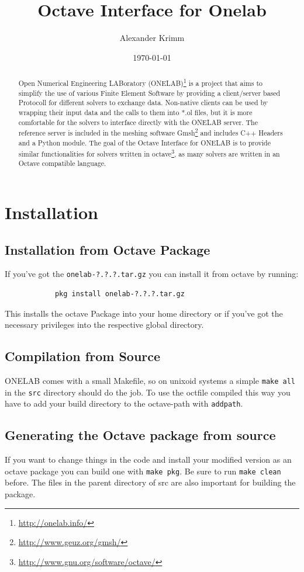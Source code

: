 \documentclass[article,english,colorback,accentcolor=tud9b,11pt]{tudreport}
\title{Octave Interface for Onelab}
\subtitle{Alexander Krimm}
\date{\today}
\begin{document}
	
    \maketitle

		\begin{abstract}
			Open Numerical Engineering LABoratory (ONELAB)\footnote{\url{http://onelab.info/}} is a project that aims to simplify the use of various Finite Element Software by providing a client/server based Protocoll for different solvers to exchange data. Non-native clients can be used by wrapping their input data and the calls to them into *.ol files, but it is more comfortable for the solvers to interface directly with the ONELAB server. The reference server is included in the meshing software Gmsh\footnote{\url{http://www.geuz.org/gmsh/}} and includes C++ Headers and a Python module. The goal of the Octave Interface for ONELAB is to provide similar functionalities for solvers written in octave\footnote{\url{http://www.gnu.org/software/octave/}}, as many solvers are written in an Octave compatible language.
		\end{abstract}

		\section{Installation}
		\subsection{Installation from Octave Package}
		If you've got the \texttt{onelab-?.?.?.tar.gz} you can install it from octave by running:
		\begin{lstlisting} 
			pkg install onelab-?.?.?.tar.gz
		\end{lstlisting}
		This installs the octave Package into your home directory or if you've got the necessary privileges into the respective global directory.

		\subsection{Compilation from Source}
		ONELAB comes with a small Makefile, so on unixoid systems a simple \texttt{make all} in the \texttt{src} directory should do the job. To use the octfile compiled this way you have to add your build directory to the octave-path with \texttt{addpath}.

		\subsection{Generating the Octave package from source}
		If you want to change things in the code and install your modified version as an octave package you can build one with \texttt{make pkg}. Be sure to run \texttt{make clean} before. The files in the parent directory of src are also important for building the package.
		
\end{document}

